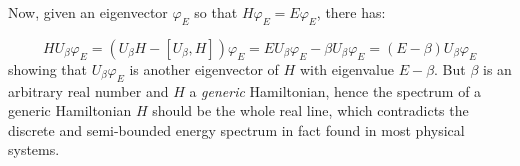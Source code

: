 \documentclass[a4paper]{article}
\begin{document}
Now, given an eigenvector $\varphi_{E}$ so that $H\varphi_{E}=E\varphi_{E}$, there has:

$$
HU_{\beta}\varphi_{E} = (U_{\beta}H - [U_{\beta}, H])\varphi_{E} =
EU_{\beta}\varphi_{E} - \beta U_{\beta}\varphi_{E} = (E-\beta)U_{\beta}\varphi_{E}
$$
showing that $U_{\beta}\varphi_{E}$ is another eigenvector of $H$ with eigenvalue
$E-\beta$. But $\beta$ is an arbitrary real number and $H$ a \emph{generic} Hamiltonian,
hence the spectrum of a generic Hamiltonian $H$ should
be the whole real line, which contradicts the discrete and semi-bounded energy spectrum
in fact found in most physical systems.

\appendix





\end{document}
